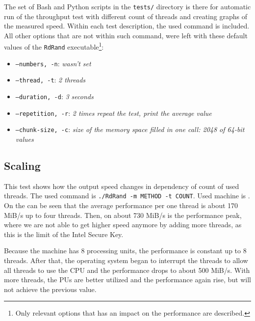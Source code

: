 The set of Bash and Python scripts in the {\tt tests/} directory is there for automatic run of the throughput test with different count of threads and creating graphs of the measured speed. Within each test description, the used command is included. All other options that are not within such command, were left with these default values of the {\tt RdRand} executable\footnote{Only relevant options that has an impact on the performance are described.}:

\begin{itemize}
 \item {\tt --numbers, -n}: {\em wasn't set}
 \item {\tt --thread, -t}: {\em 2 threads}
 \item {\tt --duration, -d}: {\em 3 seconds}
 \item {\tt --repetition, -r}: {\em 2 times repeat the test, print the average value}
 \item {\tt --chunk-size, -c}: {\em size of the memory space filled in one call: 2048 of 64-bit values}
\end{itemize}

\subsection{Scaling}
This test shows how the output speed changes in dependency of count of used threads. The used command is {\tt ./RdRand -m METHOD -t COUNT}. Used machine is . On the  can be seen that the average performance per one thread is about 170 MiB/s up to four threads. Then, on about 730 MiB/s is the performance peak, where we are not able to get higher speed anymore by adding more threads, as this is the limit of the Intel Secure Key. 

Because the machine has 8 processing units, the performance is constant up to 8 threads. After that, the operating system began to interrupt the threads to allow all threads to use the CPU and the performance drops to about 500 MiB/s. With more threads, the PUs are better utilized and the performance again rise, but will not achieve the previous value.

